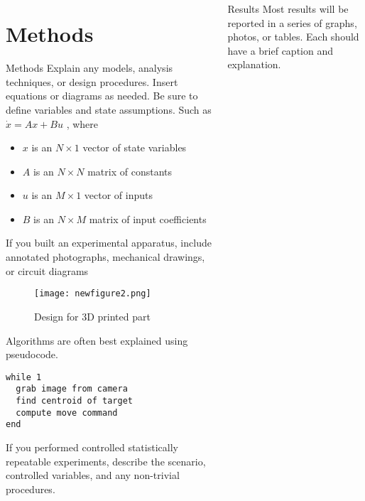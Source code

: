 \documentclass[pdf]{beamer}
\begin{document}
\begin{frame}[fragile]
\begin{columns}
\begin{column}{0.25\textwidth}
\begin{minipage}[t][\textheight]{\linewidth}
\section{Methods}
\begin{block}{Methods}\small
Explain any models, analysis techniques, or design procedures. Insert equations or diagrams as needed.  Be sure to define variables and state assumptions.  Such as $\dot{x} = Ax+Bu$ , where
\begin{itemize}
\item $x$ is an $N \times 1$ vector of state variables
\item $A$ is an $N \times N$ matrix of constants
\item $u$ is an $M \times 1$ vector of inputs
\item $B$ is an $N \times M$ matrix of input coefficients
\end{itemize}
\end{block}
\vfill

\begin{block}{}\small
If you built an experimental apparatus, include annotated photographs,  mechanical drawings, or circuit diagrams
\begin{figure}
\texttt{[image: newfigure2.png]}
\caption{Design for 3D printed part}
\end{figure}
\end{block}
\vfill

\begin{block}{}
Algorithms are often best explained using pseudocode.
\begin{lstlisting}[style=usnaMatlab]
while 1
  grab image from camera
  find centroid of target
  compute move command
end
\end{lstlisting}
\end{block}
\vfill

\begin{block}{}
If you performed controlled statistically repeatable experiments, describe the scenario, controlled variables, and any non-trivial procedures. 
\end{block}
\end{minipage}
\end{column}






\begin{column}{0.25\textwidth}
\begin{minipage}[t][\textheight]{\linewidth}
\begin{block}{Results}\small
Most results will be reported in a series of graphs, photos, or tables.   Each should have a brief caption and explanation. 


\end{block}
\end{minipage}
\end{column}
\end{columns}
\end{frame}
\end{document}
